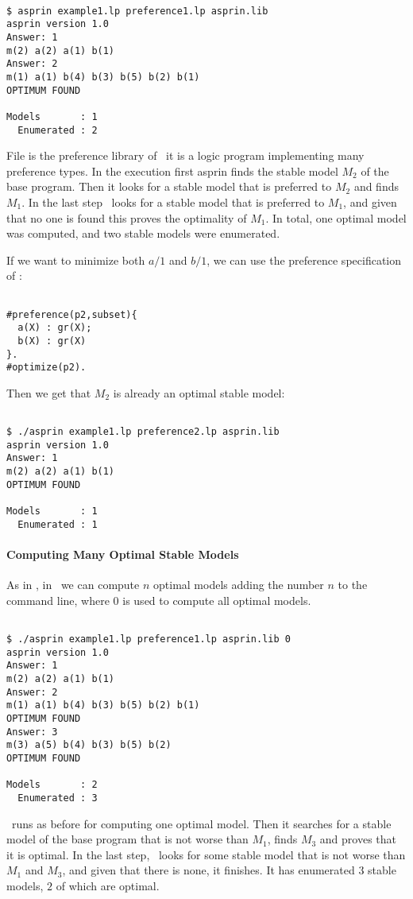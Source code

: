 \begin{lstlisting}[numbers=none]

$ asprin example1.lp preference1.lp asprin.lib
asprin version 1.0
Answer: 1
m(2) a(2) a(1) b(1)
Answer: 2
m(1) a(1) b(4) b(3) b(5) b(2) b(1)
OPTIMUM FOUND

Models       : 1
  Enumerated : 2

\end{lstlisting}
File  is the preference library of \asprin\, it is a logic program implementing many preference types.
In the execution first asprin finds the stable model $M_2$ of the base program. Then it looks for a stable model that is preferred to $M_2$ and finds $M_1$. 
In the last step \asprin\ looks for a stable model that is preferred to $M_1$,  and given that no one is found this proves the optimality of $M_1$. 
In total, one optimal model was computed, and two stable models were enumerated. 

If we want to minimize both $a/1$ and $b/1$, we can use the preference specification of : 
\begin{lstlisting}[numbers=none]

#preference(p2,subset){                                                                                             
  a(X) : gr(X);                                                                                                   
  b(X) : gr(X)                                                                                                    
}.
#optimize(p2).
\end{lstlisting}
Then we get that $M_2$ is already an optimal stable model: 
\begin{lstlisting}[numbers=none]

$ ./asprin example1.lp preference2.lp asprin.lib
asprin version 1.0
Answer: 1
m(2) a(2) a(1) b(1)
OPTIMUM FOUND

Models       : 1
  Enumerated : 1
\end{lstlisting}

\paragraph{Computing Many Optimal Stable Models}
As in \clingo, in \asprin\  we can compute $n$ optimal models adding the number $n$ to the command line,  where $0$ is used to compute all optimal models. 
\begin{lstlisting}[numbers=none]

$ ./asprin example1.lp preference1.lp asprin.lib 0
asprin version 1.0
Answer: 1
m(2) a(2) a(1) b(1)
Answer: 2
m(1) a(1) b(4) b(3) b(5) b(2) b(1)
OPTIMUM FOUND
Answer: 3
m(3) a(5) b(4) b(3) b(5) b(2)
OPTIMUM FOUND

Models       : 2
  Enumerated : 3

\end{lstlisting}
\asprin\ runs as before for computing one optimal model. Then it searches for a stable model of the base program that is not worse than $M_1$, finds $M_3$ and proves that it is optimal. 
In the last step, \asprin\ looks for some stable model that is not worse than $M_1$ and $M_3$,  and given that there is none, it finishes. 
It has enumerated $3$ stable models, $2$ of which are optimal. 

